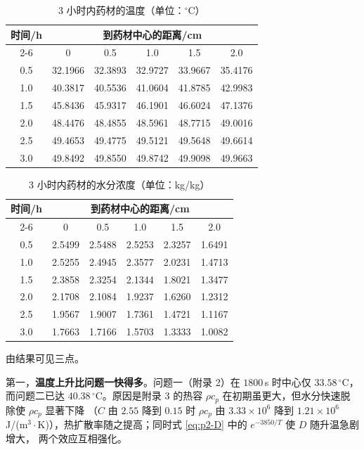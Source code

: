 \documentclass[12pt,a4paper]{ctexart}
\begin{document}
\begin{table}[htbp]
  \centering
  \caption{3 小时内药材的温度（单位：$^\circ$C）}
  \label{tab:p2-T}
  \begin{tabular}{cccccc}
    \toprule
    \multirow{2}{*}{时间/h} & \multicolumn{5}{c}{到药材中心的距离/cm} \\
    \cmidrule(lr){2-6}
     & 0     & 0.5   & 1.0   & 1.5   & 2.0 \\
    \midrule
    0.5 & 32.1966 & 32.3893 & 32.9727 & 33.9667 & 35.4176 \\
    1.0 & 40.3817 & 40.5536 & 41.0604 & 41.8785 & 42.9983 \\
    1.5 & 45.8436 & 45.9317 & 46.1901 & 46.6024 & 47.1376 \\
    2.0 & 48.4476 & 48.4855 & 48.5961 & 48.7715 & 49.0016 \\
    2.5 & 49.4653 & 49.4775 & 49.5121 & 49.5648 & 49.6614 \\
    3.0 & 49.8492 & 49.8550 & 49.8742 & 49.9098 & 49.9663 \\
    \bottomrule
  \end{tabular}
\end{table}

\begin{table}[htbp]
  \centering
  \caption{3 小时内药材的水分浓度（单位：kg/kg）}
  \label{tab:p2-C}
  \begin{tabular}{cccccc}
    \toprule
    \multirow{2}{*}{时间/h} & \multicolumn{5}{c}{到药材中心的距离/cm} \\
    \cmidrule(lr){2-6}
     & 0     & 0.5   & 1.0   & 1.5   & 2.0 \\
    \midrule
    0.5 & 2.5499 & 2.5488 & 2.5253 & 2.3257 & 1.6491 \\
    1.0 & 2.5255 & 2.4945 & 2.3577 & 2.0231 & 1.4713 \\
    1.5 & 2.3858 & 2.3254 & 2.1344 & 1.8021 & 1.3477 \\
    2.0 & 2.1708 & 2.1084 & 1.9237 & 1.6260 & 1.2312 \\
    2.5 & 1.9567 & 1.9007 & 1.7361 & 1.4721 & 1.1167 \\
    3.0 & 1.7663 & 1.7166 & 1.5703 & 1.3333 & 1.0082 \\
    \bottomrule
  \end{tabular}
\end{table}

由结果可见三点。

第一，\textbf{温度上升比问题一快得多}。问题一（附录 2）在 $1800$\,s 时中心仅
$33.58\,^\circ$C，而问题二已达 $40.38\,^\circ$C。原因是附录 3 的热容
$\rho c_p$ 在初期虽更大，但水分快速脱除使 $\rho c_p$ 显著下降
（$C$ 由 $2.55$ 降到 $0.15$ 时 $\rho c_p$ 由 $3.33\times10^6$ 降到
$1.21\times10^6$\,J/(m$^3\cdot$K)），热扩散率随之提高；同时式
\eqref{eq:p2-D} 中的 $e^{-3850/T}$ 使 $D$ 随升温急剧增大，
两个效应互相强化。
\end{document}
